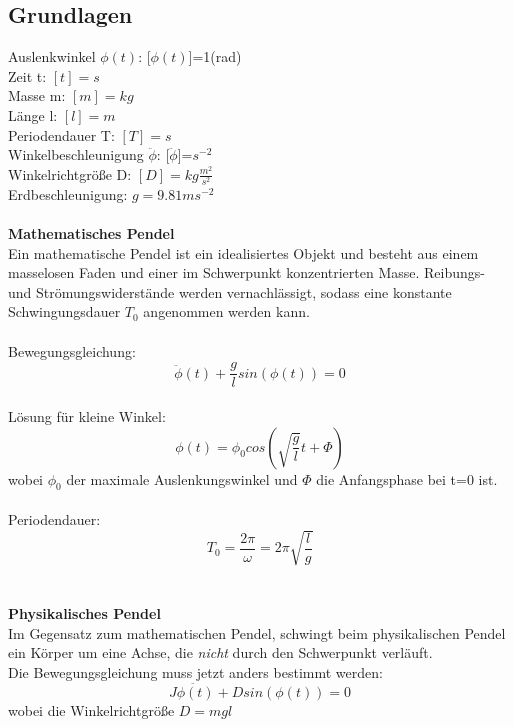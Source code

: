 \documentclass{article}
\begin{document}
\subsection{Grundlagen}
Auslenkwinkel $\phi(t)$: [$\phi(t)$]=1(rad)\\
Zeit t: $[t]=s$\\
Masse m: $[m]=kg$\\
Länge l: $[l]=m$\\
Periodendauer T: $[T]=s$\\
Winkelbeschleunigung $\ddot{\phi}$: [$\ddot{\phi}$]=$s^{-2}$\\
Winkelrichtgröße D: $[D]=kg \frac{m^2}{s^2}$\\
Erdbeschleunigung: $g=9.81ms^{-2}$\\
\\
\textbf{Mathematisches Pendel}\\
Ein mathematische Pendel ist ein idealisiertes Objekt und besteht aus einem masselosen Faden und einer im Schwerpunkt konzentrierten Masse. Reibungs- und Strömungswiderstände werden vernachlässigt, sodass eine konstante Schwingungsdauer $T_0$ angenommen werden kann.\\
\\
Bewegungsgleichung:
\begin{equation*}
\ddot{\phi}(t)+\frac{g}{l}sin(\phi(t))=0
\end{equation*}\\
Lösung für kleine Winkel:
\begin{equation*}
\phi(t)=\phi_0cos(\sqrt{\frac{g}{l}}t+\Phi)
\end{equation*}
wobei $\phi_0$ der maximale Auslenkungswinkel und $\Phi$ die Anfangsphase bei t=0 ist. \\
\\
Periodendauer:
\begin{equation*}
T_0 = \frac{2\pi}{\omega} = 2\pi\sqrt{\frac{l}{g}}
\end{equation*}\\
\\
\textbf{Physikalisches Pendel}\\
Im Gegensatz zum mathematischen Pendel, schwingt beim physikalischen Pendel ein Körper um eine Achse, die \textit{nicht} durch den Schwerpunkt verläuft.\\
Die Bewegungsgleichung muss jetzt anders bestimmt werden:
\begin{equation*}
J\ddot{\phi(t)} + D sin(\phi(t)) = 0
\end{equation*}
wobei die Winkelrichtgröße $D=mgl$\\
\end{document}
